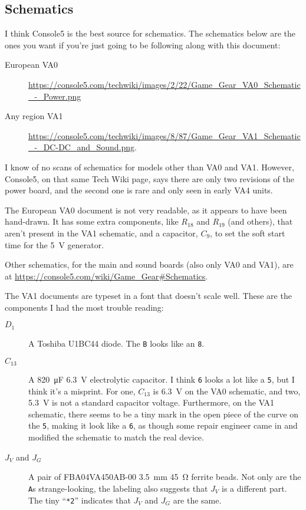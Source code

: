 \documentclass{article}
\newcommand{\model}{\textsf}
\begin{document}
\subsection{Schematics}
\label{sec:documents_schematics}
I think Console5 is the best source for schematics. The schematics
below are the ones you want if you're just going to be following along
with this document:
\begin{description}
\item[European \model{VA0}]
  \url{https://console5.com/techwiki/images/2/22/Game_Gear_VA0_Schematic_-_Power.png}
\item[Any region \model{VA1}]
  \url{https://console5.com/techwiki/images/8/87/Game_Gear_VA1_Schematic_-_DC-DC_and_Sound.png}.
\end{description}

I know of no scans of schematics for models other than \model{VA0} and
\model{VA1}. However, Console5, on that same Tech Wiki page, says
there are only two revisions of the power board, and the second one is
rare and only seen in early \model{VA4} units.

The European \model{VA0} document is not very readable, as it appears
to have been hand-drawn. It has some extra components, like $R_{18}$
and $R_{19}$ (and others), that aren't present in the \model{VA1}
schematic, and a capacitor, $C_9$, to set the soft start time for the
\qty{5}{\volt} generator.

Other schematics, for the main and sound boards (also only \model{VA0}
and \model{VA1}), are at
\url{https://console5.com/wiki/Game_Gear#Schematics}.

The \model{VA1} documents are typeset in a font that doesn't scale
well. These are the components I had the most trouble reading:

\begin{description}
\item[$D_1$] A Toshiba \model{U1BC44} diode. The \texttt{B} looks like
  an \texttt{8}.
\item[$C_{13}$] A \qty{820}{\micro\farad} \qty{6.3}{\volt}
  electrolytic capacitor. I think \texttt{6} looks a lot like a
  \texttt{5}, but I think it's a misprint. For one, $C_{13}$ is
  \qty{6.3}{\volt} on the \model{VA0} schematic, and two,
  \qty{5.3}{\volt} is not a standard capacitor voltage. Furthermore,
  on the \model{VA1} schematic, there seems to be a tiny mark in the
  open piece of the curve on the \texttt{5}, making it look like a
  \texttt{6}, as though some repair engineer came in and modified the
  schematic to match the real device.
  
\item[$J_V$ and $J_G$] A pair of \model{FBA04VA450AB-00}
  \qty{3.5}{\milli\meter} \qty{45}{\ohm} ferrite beads. Not only are
  the \texttt{A}s strange-looking, the labeling also suggests that
  $J_V$ is a different part. The tiny ``\texttt{*2}'' indicates that
  $J_V$ and $J_G$ are the same.
\end{description}
\end{document}
